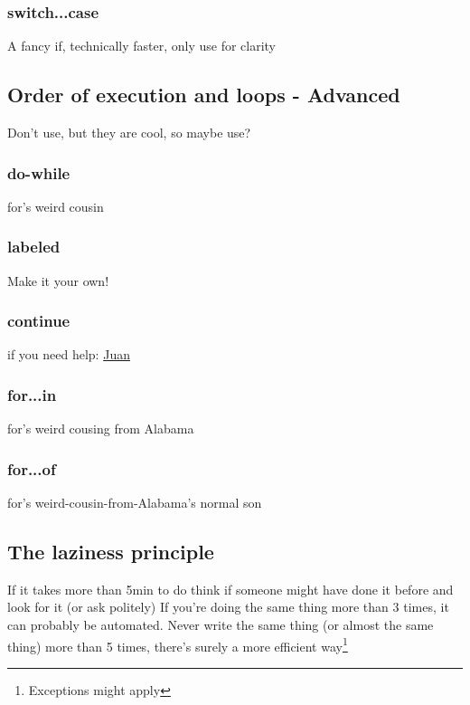     \subsubsection{switch...case}
A fancy if, technically faster, only use for clarity
\subsection{Order of execution and loops - Advanced}
Don't use, but they are cool, so maybe use?
    \subsubsection{do-while}
for's weird cousin
    \subsubsection{labeled}
Make it your own!
    \subsubsection{continue}
if you need help: \href{http://letmegooglethat.com/?q=continue}{Juan}
    \subsubsection{for...in}
for's weird cousing from Alabama
    \subsubsection{for...of}
for's weird-cousin-from-Alabama's normal son
    
    
    
\subsection{The laziness principle}

If it takes more than 5min to do think if someone might have done it before and look for it (or ask politely)
If you're doing the same thing more than 3 times, it can probably be automated. Never write the same thing (or almost the same thing) more than 5 times, there's surely a more efficient way\footnote{Exceptions might apply}